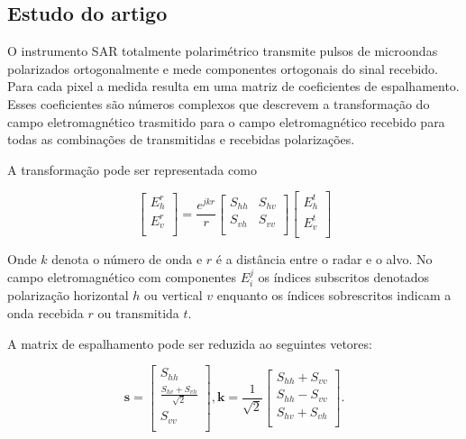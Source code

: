 \documentclass[12pt,a4paper]{article}
\begin{document}
\subsection{Estudo do artigo  \cite{anfinsen2009}}

O instrumento SAR totalmente polarimétrico transmite pulsos de microondas polarizados ortogonalmente e mede componentes ortogonais do sinal recebido. Para cada pixel a medida resulta em uma matriz de coeficientes de espalhamento. Esses coeficientes são números complexos que descrevem a transformação do campo eletromagnético trasmitido para o campo eletromagnético recebido para todas as combinações de transmitidas e recebidas polarizações.

A transformação pode ser representada como

\begin{equation}\label{eqn88}
 \left[
\begin{array}{c}
	E_{h}^{r}   \\
	E_{v}^{r}    \\
\end{array}
\right]
 = \frac{e^{jkr}}{r}\left[
\begin{array}{cc}
	S_{hh}   & S_{hv}   \\
	S_{vh}   & S_{vv}   \\
\end{array}
\right]
 \left[
\begin{array}{c}
	E_{h}^{t}   \\
	E_{v}^{t}    \\
\end{array}
\right]
\end{equation}

Onde $k$ denota o número de onda e $r$ é a distância entre o radar e o alvo. No campo eletromagnético com componentes $E_{i}^{j}$ os índices subscritos denotados polarização horizontal $h$ ou vertical $v$ enquanto os índices sobrescritos indicam a onda recebida $r$ ou transmitida $t$.    


A matrix de espalhamento pode ser reduzida ao seguintes vetores:

\begin{equation}\label{eqn89}
\mathbf{s} = \left[
\begin{array}{c}
	S_{hh}      \\
	\frac{S_{hv}+S_{vh}}{\sqrt{2}}     \\
	S_{vv}      \\
\end{array}
\right],
\mathbf{k} =\frac{1}{\sqrt{2}} \left[
\begin{array}{c}
	S_{hh} + S_{vv}      \\
	S_{hh} - S_{vv}      \\
	S_{hv} + S_{vh}      \\
\end{array}
\right].
\end{equation}
\end{document}
